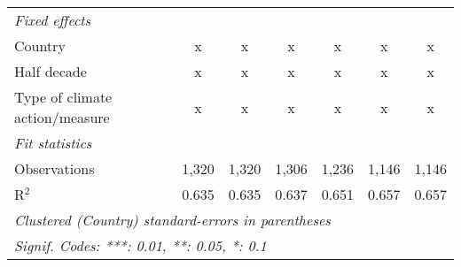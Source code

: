 \begin{tabular}{lcccccc}
   \emph{Fixed effects}\\
   Country                                           & x            & x            & x            & x       & x           & x\\  
   Half decade                                       & x            & x            & x            & x       & x           & x\\  
   Type of climate action/measure                    & x            & x            & x            & x       & x           & x\\  
   \midrule \emph{Fit statistics}\\
   Observations                                      & 1,320        & 1,320        & 1,306        & 1,236   & 1,146       & 1,146\\  
   R$^2$                                             & 0.635        & 0.635        & 0.637        & 0.651   & 0.657       & 0.657\\  
   \midrule
   \multicolumn{7}{l}{\emph{Clustered (Country) standard-errors in parentheses}}\\
   \multicolumn{7}{l}{\emph{Signif. Codes: ***: 0.01, **: 0.05, *: 0.1}}\\
\end{tabular}
\par\endgroup


